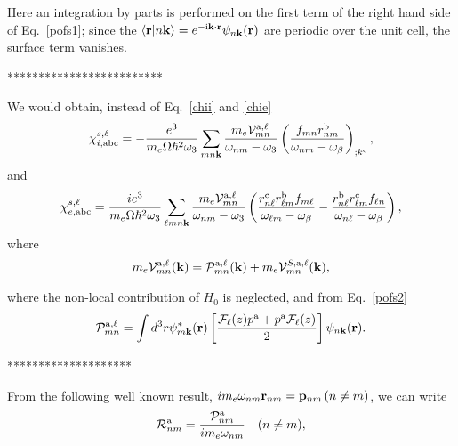 Here an integration by parts is performed on the first term of the
right hand side of Eq.~\eqref{pofs1}; since the
$\langle {\mathbf{r}} | {n\mathbf{k}} \rangle=e^{-\mathrm{i}\mathbf{k}\cdot\mathbf{r}}\psi_{n\mathbf{k}}(\mathbf{r})$ 
are periodic over the unit cell, the surface term vanishes. 

*************************

We would obtain,
instead of Eq.~\eqref{chii} and \eqref{chie}
\begin{equation}\label{chiinl}
\chi_{i,\mathrm{a}\mathrm{b}\mathrm{c}}^{s,\ell}=-\frac{e^3}{m_e\Omega\hbar^2\omega_3}\sum_{mn\mathbf{k}}
\frac{m_e{\cal V}_{mn}^{\mathrm{a},\ell}}{\omega_{nm}-\omega_3}
\left(\frac{f_{mn}r_{nm}^{\mathrm{b}}}{\omega_{nm}-\omega_\beta}\right)_{;k^{\mathrm{c}}},
\end{equation}
and
\begin{equation}\label{chienl}
\chi_{e,\mathrm{a}\mathrm{b}\mathrm{c}}^{s,\ell}=\frac{ie^3}{m_e\Omega\hbar^2\omega_3}\sum_{\ell mn\mathbf{k}}
\frac{m_e{\cal V}_{mn}^{\mathrm{a},\ell}}{\omega_{nm}-\omega_3}
\left(
\frac{r_{n\ell}^{\mathrm{c}} r_{\ell m}^{\mathrm{b}}
f_{m\ell}}{\omega_{\ell m}-\omega_\beta}
-\frac{r_{n\ell}^{\mathrm{b}} r_{\ell m}^{\mathrm{c}}
f_{\ell n}}{\omega_{n \ell}-\omega_\beta}
\right),
\end{equation}
where
\begin{eqnarray}\label{nl.5}
m_e{\cal V}_{mn}^{\mathrm{a},\ell}(\mathbf{k})=
{\cal P}^{\mathrm{a},\ell}_{mn}(\mathbf{k})
+
m_e{\cal V}^{S,\mathrm{a},\ell}_{mn}(\mathbf{k})
,
\end{eqnarray}



where the non-local contribution of $H_0$ is neglected, and from Eq.~\eqref{pofs2}
\begin{equation}\label{calpmn}
{\mathbf{\cal P}}_{mn}^{\mathrm{a},\ell}=\int d^3 r
\psi^*_{m\mathbf{k}}(\mathbf{r})
\left[\frac{{\mathbf{\cal F}}_\ell(z) p^{\mathrm{a}} +
p^{\mathrm{a}} {\mathbf{\cal F}}_\ell(z)}{2}\right]
\psi_{n\mathbf{k}}(\mathbf{r}).
\end{equation}

********************

From the following well known result,
$im_e\omega_{nm}\mathbf{r}_{nm}=\mathbf{p}_{nm}\,(n\neq m)$, 
we can write
\begin{equation}\label{rcal}
{\cal R}^{\mathrm{a}}_{nm}=\frac{{\cal P}^{\mathrm{a}}_{nm}}{im_e\omega_{nm}}\quad(n\neq m)
,
\end{equation} 
